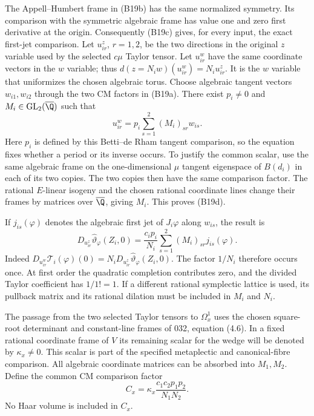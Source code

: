 The Appell--Humbert frame in (B19b) has the same normalized
symmetry.  Its comparison with the symmetric algebraic frame has
value one and zero first derivative at the origin.  Consequently
(B19c) gives, for every input, the exact first-jet comparison.
Let $u^z_{ir}$, $r=1,2$, be the two directions in the original
$z$ variable used by the selected $c\mu$ Taylor tensor.  Let
$u^w_{ir}$ have the same coordinate vectors in the $w$ variable;
thus $d(z=N_iw)(u^w_{ir})=N_i u^z_{ir}$.  It is the
$w$ variable that uniformizes the chosen algebraic torus.  Choose
algebraic tangent vectors $w_{i1},w_{i2}$ through the two CM
factors in (B19a).  There exist $p_i\ne0$ and
$M_i\in\operatorname{GL}_2(\overline\Q)$ such that
\[
 u^w_{ir}=p_i\sum_{s=1}^2 (M_i)_{sr}w_{is}.
 \tag{B19d}
\]
Here $p_i$ is defined by this Betti--de Rham tangent comparison,
so the equation fixes whether a period or its inverse occurs.
To justify the common scalar, use the same algebraic frame on
the one-dimensional $\mu$ tangent eigenspace of $B(d_i)$ in
each of its two copies.  The two copies then have the same
comparison factor.  The rational $E$-linear isogeny and the
chosen rational coordinate lines change their frames by matrices
over $\overline\Q$, giving $M_i$.  This proves (B19d).

If $j_{is}(\varphi)$ denotes the algebraic first jet of
$J_i\varphi$ along $w_{is}$, the result is
\begin{equation}\label{B19-jet}
 D_{u^z_{ir}}\widehat\vartheta_{\varphi}(Z_i,0)
   =\frac{c_ip_i}{N_i}
        \sum_{s=1}^2(M_i)_{sr}j_{is}(\varphi).
 \tag{B19e}
\end{equation}
Indeed $D_{u^w_{ir}}\mathcal T_i(\varphi)(0)
=N_iD_{u^z_{ir}}\widehat\vartheta_{\varphi}(Z_i,0)$.
The factor $1/N_i$ therefore occurs once.  At first order the
quadratic completion contributes zero, and the divided Taylor
coefficient has $1/1!=1$.  If a different rational symplectic
lattice is used, its pullback matrix and its rational dilation
must be included in $M_i$ and $N_i$.

The passage from the two selected Taylor tensors to
$\Omega_x^1$ uses the chosen square-root determinant and
constant-line frames of 032, equation (4.6).  In a fixed rational
coordinate frame of $V$ its remaining scalar for the wedge will
be denoted by $\kappa_x\ne0$.  This scalar is part of the
specified metaplectic and canonical-fibre comparison.  All
algebraic coordinate matrices can be absorbed into $M_1,M_2$.
Define the common CM comparison factor
\[
 C_x=\kappa_x\frac{c_1c_2p_1p_2}{N_1N_2}.
 \tag{B19f}
\]
No Haar volume is included in $C_x$.

